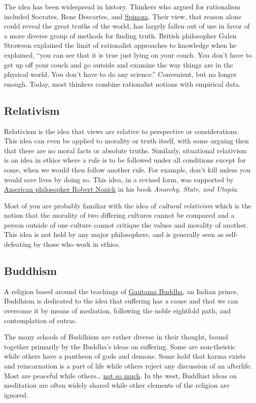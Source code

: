 \documentclass[../my_knowledge.tex]{subfiles}
\begin{document}
The idea has been widespread in history. Thinkers who argued for rationalism included Socrates, Rene Descartes, and \href{https://www.youtube.com/watch?v=pVEeXjPiw54}{Spinoza}. Their view, that reason alone could reveal the great truths of the world, has largely fallen out of use in favor of a more diverse group of methods for finding truth. British philosopher Galen Strawson explained the limit of rationalist approaches to knowledge when he explained, “you can see that it is true just lying on your couch. You don’t have to get up off your couch and go outside and examine the way things are in the physical world. You don’t have to do any science.” Convenient, but no longer enough. Today, most thinkers combine rationalist notions with empirical data.

\subsection{Relativism}
Relativism is the idea that views are relative to perspective or considerations. This idea can even be applied to morality or truth itself, with some arguing then that there are no moral facts or absolute truths. Similarly, situational relativism is an idea in ethics where a rule is to be followed under all conditions except for some, when we would then follow another rule. For example, don’t kill unless you would save lives by doing so. This idea, in a revised form, was supported by \href{https://bigthink.com/scotty-hendricks/10-american-philosophers-and-why-you-should-know-them}{American philosopher Robert Nozick} in his book \textit{Anarchy, State, and Utopia}.

Most of you are probably familiar with the idea of \textit{cultural relativism} which is the notion that the morality of two differing cultures cannot be compared and a person outside of one culture cannot critique the values and morality of another. This idea is not held by any major philosophers, and is generally seen as self-defeating by those who work in ethics.

\subsection{Buddhism}
A religion based around the teachings of \href{https://www.youtube.com/watch?v=tilBs32zN7I}{Gautama Buddha}, an Indian prince, Buddhism is dedicated to the idea that suffering has a cause and that we can overcome it by means of mediation, following the noble eightfold path, and contemplation of sutras.

The many schools of Buddhism are rather diverse in their thought, bound together primarily by the Buddha’s ideas on suffering. Some are non-theistic while others have a pantheon of gods and demons. Some hold that karma exists and reincarnation is a part of life while others reject any discussion of an afterlife. Most are peaceful while others… \href{https://en.wikipedia.org/wiki/Buddhism_and_violence}{not so much}. In the west, Buddhist ideas on meditation are often widely shared while other elements of the religion are ignored.
\end{document}
